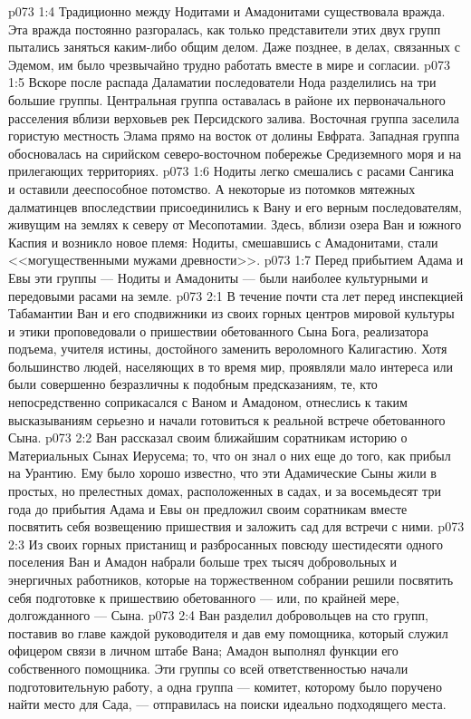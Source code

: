 \vs p073 1:4 Традиционно между Нодитами и Амадонитами существовала вражда. Эта вражда постоянно разгоралась, как только представители этих двух групп пытались заняться каким\hyp{}либо общим делом. Даже позднее, в делах, связанных с Эдемом, им было чрезвычайно трудно работать вместе в мире и согласии.
\vs p073 1:5 Вскоре после распада Даламатии последователи Нода разделились на три большие группы. Центральная группа оставалась в районе их первоначального расселения вблизи верховьев рек Персидского залива. Восточная группа заселила гористую местность Элама прямо на восток от долины Евфрата. Западная группа обосновалась на сирийском северо\hyp{}восточном побережье Средиземного моря и на прилегающих территориях.
\vs p073 1:6 Нодиты легко смешались с расами Сангика и оставили дееспособное потомство. А некоторые из потомков мятежных далматинцев впоследствии присоединились к Вану и его верным последователям, живущим на землях к северу от Месопотамии. Здесь, вблизи озера Ван и южного Каспия и возникло новое племя: Нодиты, смешавшись с Амадонитами, стали <<могущественными мужами древности>>.
\vs p073 1:7 Перед прибытием Адама и Евы эти группы --- Нодиты и Амадониты --- были наиболее культурными и передовыми расами на земле.
\vs p073 2:1 В течение почти ста лет перед инспекцией Табамантии Ван и его сподвижники из своих горных центров мировой культуры и этики проповедовали о пришествии обетованного Сына Бога, реализатора подъема, учителя истины, достойного заменить вероломного Калигастию. Хотя большинство людей, населяющих в то время мир, проявляли мало интереса или были совершенно безразличны к подобным предсказаниям, те, кто непосредственно соприкасался с Ваном и Амадоном, отнеслись к таким высказываниям серьезно и начали готовиться к реальной встрече обетованного Сына.
\vs p073 2:2 Ван рассказал своим ближайшим соратникам историю о Материальных Сынах Иерусема; то, что он знал о них еще до того, как прибыл на Урантию. Ему было хорошо известно, что эти Адамические Сыны жили в простых, но прелестных домах, расположенных в садах, и за восемьдесят три года до прибытия Адама и Евы он предложил своим соратникам вместе посвятить себя возвещению пришествия и заложить сад для встречи с ними.
\vs p073 2:3 Из своих горных пристанищ и разбросанных повсюду шестидесяти одного поселения Ван и Амадон набрали больше трех тысяч добровольных и энергичных работников, которые на торжественном собрании решили посвятить себя подготовке к пришествию обетованного --- или, по крайней мере, долгожданного --- Сына.
\vs p073 2:4 Ван разделил добровольцев на сто групп, поставив во главе каждой руководителя и дав ему помощника, который служил офицером связи в личном штабе Вана; Амадон выполнял функции его собственного помощника. Эти группы со всей ответственностью начали подготовительную работу, а одна группа --- комитет, которому было поручено найти место для Сада, --- отправилась на поиски идеально подходящего места.
